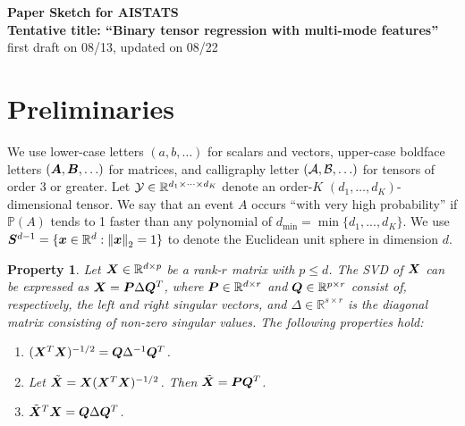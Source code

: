 \documentclass[11pt]{article}
\theoremstyle{plain}
\newtheorem{pro}{Property}
\theoremstyle{definition}
\begin{document}
\begin{center}
{\bf \large Paper Sketch for AISTATS\\
Tentative title: ``Binary tensor regression with multi-mode features''}\\
first draft on 08/13, updated on 08/22
\end{center}

\section{Preliminaries}


We use lower-case letters $(a, b, \ldots)$ for scalars and vectors, upper-case boldface letters $(\bm A, \bm B, \ldots)$ for matrices, and calligraphy letter $(\mathcal{A},\mathcal{B},\ldots)$ for tensors of order 3 or greater. Let $\mathcal{Y} \in \mathbb{R}^{d_1\times \cdots \times d_K}$ denote an order-$K$ $(d_1,\ldots,d_K)$-dimensional tensor. We say that an event $A$ occurs ``with very high probability'' if $\mathbb{P}(A)$ tends to 1 faster than any polynomial of $d_{\min}=\min\{d_1, . . . , d_K\}$. We use $\bm S^{d-1}=\{\bm x\in\mathbb{R}^d: \left\lVert\bm x\right\rVert_2=1\}$ to denote the Euclidean unit sphere in dimension $d$.\\


\begin{pro}\label{eq:defn}
Let $\bm X\in\mathbb{R}^{d\times p}$ be a rank-$r$ matrix with $p\leq d$. The SVD of $\bm X$ can be expressed as $\bm X=\bm{P}\Delta\bm{Q}^T$, where $\bm{P}\in\mathbb{R}^{d\times r}$ and $\bm{Q}\in\mathbb{R}^{p\times r}$ consist of, respectively, the left and right singular vectors, and $\Delta\in\mathbb{R}^{s\times r}$ is the diagonal matrix consisting of non-zero singular values. The following properties hold:
\begin{enumerate}
\item $(\bm X^T\bm X)^{-1/2}=\bm{Q}\Delta^{-1}\bm{Q}^T$.
\item Let $\tilde {\bm X}=\bm X(\bm X^T\bm X)^{-1/2}$. Then $\tilde {\bm X}=\bm{P}\bm{Q}^{T}$.
\item $\tilde {\bm X}^T\bm X=\bm{Q}\Delta\bm{Q}^T$.
\end{enumerate}
\end{pro}
\end{document}
